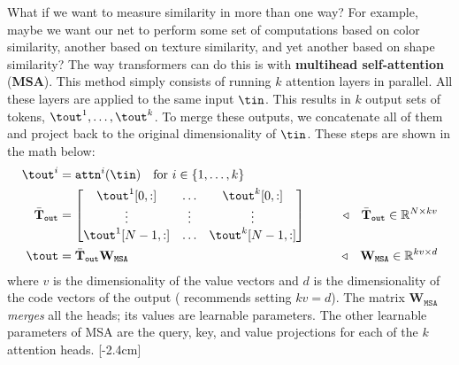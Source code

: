 What if we want to measure similarity in more than one way? For example, maybe we want our net to perform some set of computations based on color similarity, another based on texture similarity, and yet another based on shape similarity? The way transformers can do this is with \textbf{multihead self-attention} (\textbf{MSA}). This method simply consists of running $k$ attention layers in parallel. All these layers are applied to the same input $\tin$. This results in $k$ output sets of tokens, $\tout^1, \ldots, \tout^k$. To merge these outputs, we concatenate all of them and project back to the original dimensionality of $\tin$. These steps are shown in the math below:
\begin{align}
    \tout^i                         & = \texttt{attn}^i(\tin) \quad \text{for } i \in \{1,\ldots,k\}                                                                                                                            \\
    \bar{\mathbf{T}}_{\texttt{out}} & = \begin{bmatrix}
                                            \tout^1[0,:]   & \ldots & \tout^k[0,:]   \\
                                            \vdots         & \vdots & \vdots         \\
                                            \tout^1[N-1,:] & \ldots & \tout^k[N-1,:] \\
                                        \end{bmatrix}                    & \quad\quad \triangleleft \quad \bar{\mathbf{T}}_{\texttt{out}} \in \mathbb{R}^{N \times kv}                                                          \\
    \tout                           & = \bar{\mathbf{T}}_{\texttt{out}}\mathbf{W}_{\texttt{MSA}}     & \quad\quad \triangleleft \quad \mathbf{W}_{\texttt{MSA}} \in \mathbb{R}^{kv \times d} \label{eqn:transformers:MSA_merge}
\end{align}
where $v$ is the dimensionality of the value vectors and $d$ is the dimensionality of the code vectors of the output (\cite{dosovitskiy2020vit} recommends setting $kv = d$). The matrix $\mathbf{W}_{\texttt{MSA}}$ \textit{merges} all the heads; its values are learnable parameters. The other learnable parameters of MSA are the query, key, and value projections for each of the $k$ attention heads.
[-2.4cm]

